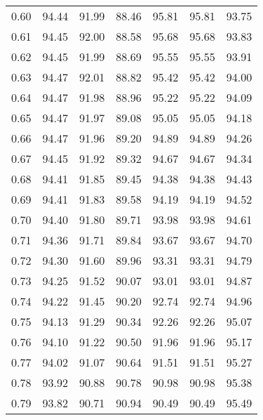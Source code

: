 \begin{tabular}{|c|c|c|c|c|c|c|}
      0.60 &     94.44 &     91.99 &      88.46 &   95.81 &      95.81 &         93.75 \\
      0.61 &     94.45 &     92.00 &      88.58 &   95.68 &      95.68 &         93.83 \\
      0.62 &     94.45 &     91.99 &      88.69 &   95.55 &      95.55 &         93.91 \\
      0.63 &     94.47 &     92.01 &      88.82 &   95.42 &      95.42 &         94.00 \\
      0.64 &     94.47 &     91.98 &      88.96 &   95.22 &      95.22 &         94.09 \\
      0.65 &     94.47 &     91.97 &      89.08 &   95.05 &      95.05 &         94.18 \\
      0.66 &     94.47 &     91.96 &      89.20 &   94.89 &      94.89 &         94.26 \\
      0.67 &     94.45 &     91.92 &      89.32 &   94.67 &      94.67 &         94.34 \\
      0.68 &     94.41 &     91.85 &      89.45 &   94.38 &      94.38 &         94.43 \\
      0.69 &     94.41 &     91.83 &      89.58 &   94.19 &      94.19 &         94.52 \\
      0.70 &     94.40 &     91.80 &      89.71 &   93.98 &      93.98 &         94.61 \\
      0.71 &     94.36 &     91.71 &      89.84 &   93.67 &      93.67 &         94.70 \\
      0.72 &     94.30 &     91.60 &      89.96 &   93.31 &      93.31 &         94.79 \\
      0.73 &     94.25 &     91.52 &      90.07 &   93.01 &      93.01 &         94.87 \\
      0.74 &     94.22 &     91.45 &      90.20 &   92.74 &      92.74 &         94.96 \\
      0.75 &     94.13 &     91.29 &      90.34 &   92.26 &      92.26 &         95.07 \\
      0.76 &     94.10 &     91.22 &      90.50 &   91.96 &      91.96 &         95.17 \\
      0.77 &     94.02 &     91.07 &      90.64 &   91.51 &      91.51 &         95.27 \\
      0.78 &     93.92 &     90.88 &      90.78 &   90.98 &      90.98 &         95.38 \\
      0.79 &     93.82 &     90.71 &      90.94 &   90.49 &      90.49 &         95.49 \\

\end{tabular}
